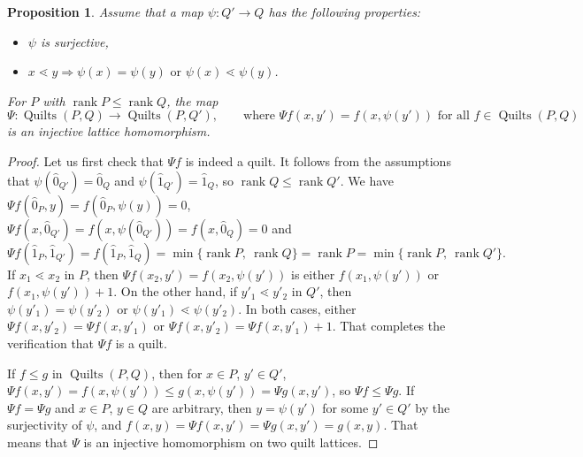 \documentclass[12pt]{amsart}
\numberwithin{equation}{section}
\newtheorem{prop}[theorem]{Proposition}
\theoremstyle{definition}
\newcommand{\longto}{\longrightarrow}
\newcommand{\quilt}{\operatorname{Quilts}}
\newcommand{\rank}{\operatorname{rank}}
\begin{document}
\begin{prop}
 Assume that a map $\psi \colon Q' \to Q$ has the following properties:
 \begin{itemize}
  \item $\psi$ is surjective,
  \item $x \lessdot y \Rightarrow \psi(x) = \psi(y) \mbox{ or } \psi(x) \lessdot \psi(y)$.
 \end{itemize}
 For $P$ with $\rank P \leq \rank Q$, the map
 $$\Psi \colon \quilt(P,Q) \longto \quilt(P,Q'), \qquad \text{where }
 \Psi f(x,y') = f(x,\psi(y')) \text{ for all } f \in \quilt(P,Q)$$
 is an injective lattice homomorphism.
\end{prop}
\begin{proof}
 Let us first check that $\Psi f$ is indeed a quilt. It follows from
the assumptions that $\psi(\hat 0_{Q'}) = \hat 0_Q$ and $\psi(\hat
1_{Q'}) = \hat 1_Q$, so $\rank Q \leq \rank Q'$.  We have $\Psi f(\hat
0_P,y) = f(\hat 0_P,\psi(y)) = 0$, $\Psi f(x, \hat 0_{Q'}) =
f(x,\psi(\hat 0_{Q'})) = f(x, \hat 0_Q) = 0$ and $$\Psi f(\hat 1_P,
\hat 1_{Q'}) = f(\hat 1_P,\hat 1_Q) = \min\{\rank P,\ \rank Q\} = \rank
P = \min\{\rank P,\ \rank Q'\}.
$$
If $x_1 \lessdot x_2$ in $P$, then $\Psi f(x_2,y') = f(x_2,\psi(y'))$
is either $f(x_1,\psi(y'))$ or $f(x_1,\psi(y')) + 1$. On the other
hand, if $y'_1 \lessdot y'_2$ in $Q'$, then $\psi(y'_1) = \psi(y'_2)$
or $\psi(y'_1) \lessdot \psi(y'_2)$. In both cases, either $\Psi
f(x,y'_2) = \Psi f(x,y'_1)$ or $\Psi f(x,y'_2) = \Psi f(x,y'_1) +
1$. That completes the verification that $\Psi f$ is a quilt.

 If $f \leq g$ in $\quilt(P,Q)$, then for $x \in P$, $y' \in Q'$,
$\Psi f(x,y') = f(x,\psi(y')) \leq g(x,\psi(y')) = \Psi g(x,y')$, so
$\Psi f \leq \Psi g$. If $\Psi f = \Psi g$ and $x \in P$, $y \in Q$
are arbitrary, then $y = \psi(y')$ for some $y' \in Q'$ by the
surjectivity of $\psi$, and $f(x,y) = \Psi f(x,y') = \Psi g(x,y') =
g(x,y)$. That means that $\Psi$ is an injective homomorphism on two
quilt lattices.
\end{proof}

\newcommand{\mm}{n}
\newcommand{\mn}{m}
\end{document}
